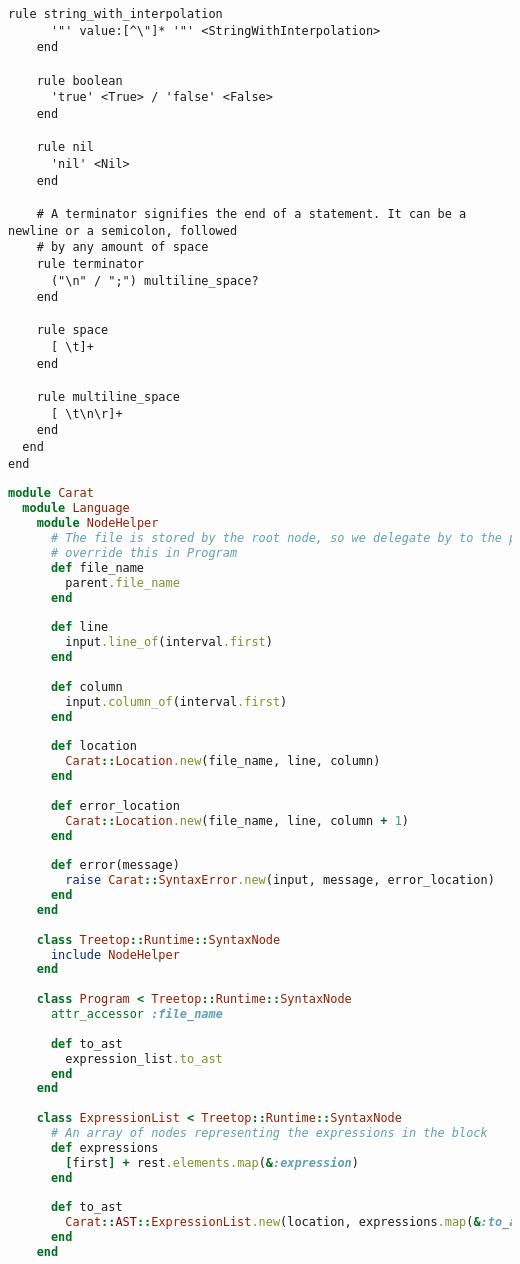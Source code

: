 \begin{lstlisting}[title={\small\Helvetica parser/language.treetop},language=treetop]
    rule string_with_interpolation
      '"' value:[^\"]* '"' <StringWithInterpolation>
    end
    
    rule boolean
      'true' <True> / 'false' <False>
    end
    
    rule nil
      'nil' <Nil>
    end
    
    # A terminator signifies the end of a statement. It can be a newline or a semicolon, followed
    # by any amount of space
    rule terminator
      ("\n" / ";") multiline_space?
    end
    
    rule space
      [ \t]+
    end
    
    rule multiline_space
      [ \t\n\r]+
    end
  end
end

\end{lstlisting}
\begin{lstlisting}[title={\small\Helvetica parser/nodes.rb},language=Ruby]
module Carat
  module Language
    module NodeHelper
      # The file is stored by the root node, so we delegate by to the parent by default and then
      # override this in Program
      def file_name
        parent.file_name
      end
      
      def line
        input.line_of(interval.first)
      end
      
      def column
        input.column_of(interval.first)
      end
      
      def location
        Carat::Location.new(file_name, line, column)
      end
      
      def error_location
        Carat::Location.new(file_name, line, column + 1)
      end
      
      def error(message)
        raise Carat::SyntaxError.new(input, message, error_location)
      end
    end
    
    class Treetop::Runtime::SyntaxNode
      include NodeHelper
    end
    
    class Program < Treetop::Runtime::SyntaxNode
      attr_accessor :file_name
      
      def to_ast
        expression_list.to_ast
      end
    end
  
    class ExpressionList < Treetop::Runtime::SyntaxNode
      # An array of nodes representing the expressions in the block
      def expressions
        [first] + rest.elements.map(&:expression)
      end
      
      def to_ast
        Carat::AST::ExpressionList.new(location, expressions.map(&:to_ast).compact)
      end
    end
    

\end{lstlisting}
